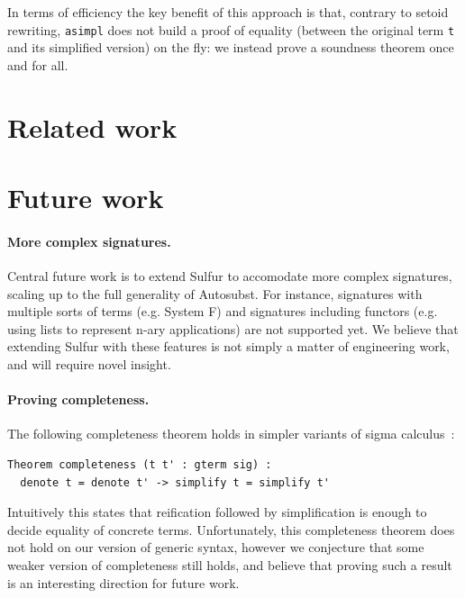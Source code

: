 \documentclass[sigplan,review,anonymous]{acmart}
\newcommand{\coq}[1]{\texttt{#1}}
\begin{document}
In terms of efficiency the key benefit of this approach is that,
contrary to setoid rewriting,
\coq{asimpl} does not build a proof of equality (between the original
term \coq{t} and its simplified version) on the fly: we instead prove
a soundness theorem once and for all.

%

\section{Related work}




\section{Future work}

\paragraph{More complex signatures.} Central future work is to extend
Sulfur to accomodate
more complex signatures, scaling up to the full generality of
Autosubst. For instance, signatures with multiple sorts of terms
(e.g. System F) and signatures including functors (e.g. using lists to represent
n-ary applications) are not supported yet. We believe that extending Sulfur
with these features is not simply a matter of engineering work, and will require
novel insight.

\paragraph{Proving completeness.} The following completeness theorem holds in
simpler variants of sigma calculus~\cite{sigma-calculus-completeness}:
\begin{verbatim}
Theorem completeness (t t' : gterm sig) :
  denote t = denote t' -> simplify t = simplify t'
\end{verbatim}
Intuitively this states that reification followed by simplification
is enough to decide equality of concrete terms.
Unfortunately, this completeness theorem does not hold on our version
of generic syntax, however we conjecture that some weaker version of
completeness still holds, and believe that proving such a result
is an interesting direction for future work.



\end{document}
